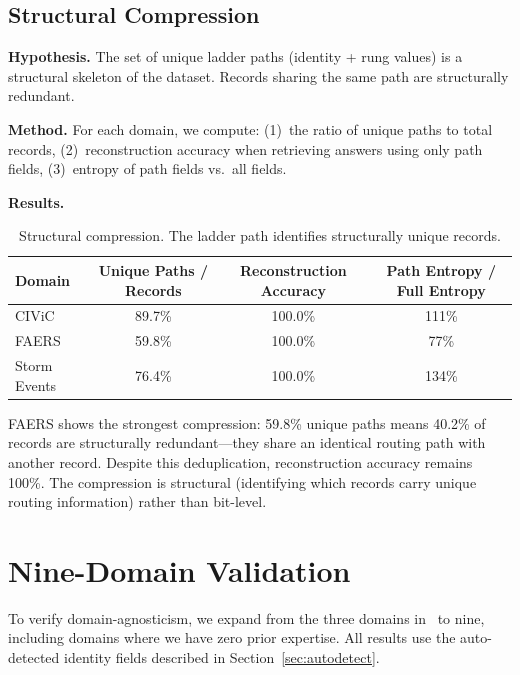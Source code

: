 \documentclass[11pt]{article}
\begin{document}
\subsection{Structural Compression}

\textbf{Hypothesis.} The set of unique ladder paths (identity + rung values) is a structural skeleton of the dataset. Records sharing the same path are structurally redundant.

\textbf{Method.} For each domain, we compute: (1)~the ratio of unique paths to total records, (2)~reconstruction accuracy when retrieving answers using only path fields, (3)~entropy of path fields vs.\ all fields.

\textbf{Results.}

\begin{table}[h]
\centering
\begin{tabular}{lccc}
\toprule
Domain & Unique Paths / Records & Reconstruction Accuracy & Path Entropy / Full Entropy \\
\midrule
CIViC & 89.7\% & 100.0\% & 111\% \\
FAERS & 59.8\% & 100.0\% & 77\% \\
Storm Events & 76.4\% & 100.0\% & 134\% \\
\bottomrule
\end{tabular}
\caption{Structural compression. The ladder path identifies structurally unique records.}
\label{tab:compression}
\end{table}

FAERS shows the strongest compression: 59.8\% unique paths means 40.2\% of records are structurally redundant---they share an identical routing path with another record. Despite this deduplication, reconstruction accuracy remains 100\%. The compression is structural (identifying which records carry unique routing information) rather than bit-level.

\section{Nine-Domain Validation}

To verify domain-agnosticism, we expand from the three domains in~\cite{elms2026dw} to nine, including domains where we have zero prior expertise. All results use the auto-detected identity fields described in Section~\ref{sec:autodetect}.
\end{document}
